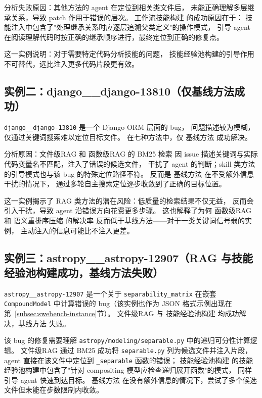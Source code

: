 分析失败原因：其他方法的 agent 在定位到相关类文件后，
未能正确理解多层继承关系，导致 patch 作用于错误的层次。
工作流技能构建 的成功原因在于：
技能注入中包含了"处理继承关系时应逐层追溯父类定义"的操作模式，
引导 agent 在阅读理解代码时按正确的继承顺序进行，最终定位到正确的修复点。

这一实例说明：对于需要特定代码分析技能的问题，
技能经验池构建的引导作用不可替代，远比注入更多代码片段更有效。

\subsection{实例二：django\_\_django-13810（仅基线方法成功）}
\label{subsec:case-django-13810}

\texttt{django\_\_django-13810} 是一个 Django ORM 层面的 bug，
问题描述较为模糊，仅通过关键词搜索难以定位目标文件。
在七种方法中，仅 基线方法 成功解决。

分析原因：文件级RAG 和 函数级RAG 的 BM25 检索
因 issue 描述关键词与实际代码变量名不匹配，注入了错误的候选文件，
干扰了 agent 的判断；skill 类方法的引导模式也与该 bug 的特殊定位路径不符。
反而是 基线方法 在不受额外信息干扰的情况下，
通过多轮自主搜索定位逐步收敛到了正确的目标位置。

这一实例揭示了 RAG 类方法的潜在风险：低质量的检索结果不仅无益，
反而会引入干扰，导致 agent 沿错误方向花费更多步骤。
这也解释了为何 函数级RAG 和 语义重排序压缩 的解决率
反而低于基线方法——对于一类关键词信号弱的实例，
主动注入的信息可能比不注入更差。

\subsection{实例三：astropy\_\_astropy-12907（RAG 与技能经验池构建成功，基线方法失败）}
\label{subsec:case-astropy-12907}

\texttt{astropy\_\_astropy-12907} 是一个关于 \texttt{separability\_matrix}
在嵌套 \texttt{CompoundModel} 中计算错误的 bug（该实例也作为 JSON 格式示例出现在
第~\ref{subsec:swebench-instance}节）。
文件级RAG 与 技能经验池构建 均成功解决，基线方法 失败。

该 bug 的修复需要理解 \texttt{astropy/modeling/separable.py} 中的递归可分性计算逻辑。
文件级RAG 通过 BM25 成功将 \texttt{separable.py} 列为候选文件并注入片段，
agent 直接在该文件中定位到 \texttt{\_separable} 函数的错误；
技能经验池构建 的技能经验池构建中包含了"针对 compositing 模型应检查递归展开函数"的模式，
同样引导 agent 快速到达目标。
基线方法 在没有额外信息的情况下，尝试了多个候选文件但未能在步数限制内收敛。

